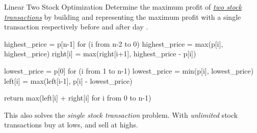 \documentclass{cognito}
\begin{document}
\begin{note}{Linear Two Stock Optimization}
	Determine the maximum profit of \hyperref[note:Two Stock Transactions]{\it two stock transactions}
	by building  and  representing the maximum profit with a single transaction
	respectively before and after day .
	
	\begin{largecode}
 highest_price = p[n-1]
 for (i from n-2 to 0)
 	highest_price = max(p[i], highest_price)
	right[i] = max(right[i+1], highest_price - p[i])

 lowest_price = p[0]
 for (i from 1 to n-1)
	lowest_price = min(p[i], lowest_price)
	left[i] = max(left[i-1], p[i] - lowest_price)
	
 return max(left[i] + right[i] for i from 0 to n-1)
	\end{largecode}
	
	\begin{remark}
		This also solves the {\it single stock transaction} problem.
		With {\it unlimited} stock transactions buy at lows, and sell at highs.
	\end{remark}
	\vspace{-5pt}
\end{note}
\end{document}
